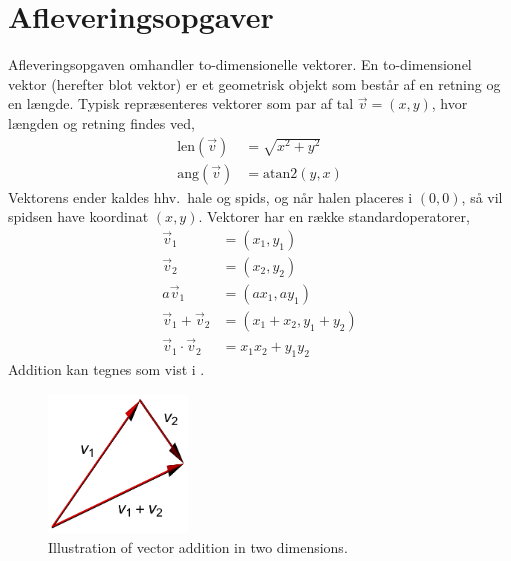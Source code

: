 \documentclass[a4paper,12pt]{article}
\begin{document}
\section*{Afleveringsopgaver}
Afleveringsopgaven omhandler to-dimensionelle vektorer. En to-dimensionel vektor (herefter blot vektor) er et geometrisk objekt som består af en retning og en længde. Typisk repræsenteres vektorer som par af tal $\vec v  = (x, y)$, hvor længden og retning findes ved,
\begin{align}
  \text{len}(\vec v) &= \sqrt{x^2+y^2}
  \\\text{ang}(\vec v) &=\text{atan2}(y, x)
\end{align}
Vektorens ender kaldes hhv.\ hale og spids, og når halen placeres i $(0, 0)$, så vil spidsen have koordinat $(x, y)$. Vektorer har en række standardoperatorer,
\begin{align}
  \vec v_1 &= (x_1, y_1)
  \\\vec v_2 &= (x_2, y_2)
  \\a \vec v_1 &= (a x_1, a y_1)
  \\\vec v_1 + \vec v_2 &= (x_1+x_2, y_1+y_2)
  \\\vec v_1 \cdot \vec v_2 &= x_1 x_2 +  y_1y_2
\end{align}
Addition kan tegnes som vist i .
\begin{figure}
  \centering
  \includegraphics[width=0.33\textwidth]{vectorAddition}
  \caption{Illustration of vector addition in two dimensions.}
  \label{fig:vectorAddition}
\end{figure}
\end{document}
